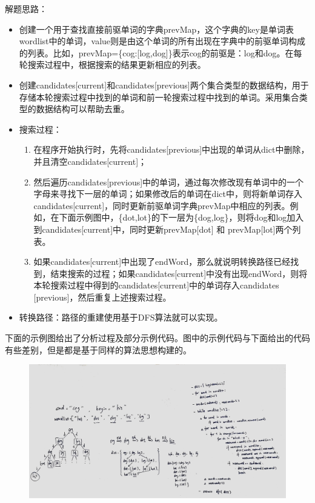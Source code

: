 \documentclass[a4paper,10pt]{article}
\begin{document}
\begin{CJK*}{UTF8}{gbsn}
\noindent 解题思路：
\begin{itemize}
    \item 创建一个用于查找直接前驱单词的字典prevMap，这个字典的key是单词表wordlist中的单词，value则是由这个单词的所有出现在字典中的前驱单词构成的列表。比如，prevMap=\{cog:[log,dog]\}表示cog的前驱是：log和dog。在每轮搜索过程中，根据搜索的结果更新相应的列表。
    \item 创建candidates[current]和candidates[previous]两个集合类型的数据结构，用于存储本轮搜索过程中找到的单词和前一轮搜索过程中找到的单词。采用集合类型的数据结构可以帮助去重。
    \item 搜索过程：
        \begin{enumerate}
            \item 在程序开始执行时，先将candidates[previous]中出现的单词从dict中删除，并且清空candidates[current]；
            
            \item 然后遍历candidates[previous]中的单词，通过每次修改现有单词中的一个字母来寻找下一层的单词；如果修改后的单词在dict中，则将新单词存入candidates[current]，同时更新前驱单词字典prevMap中相应的列表。例如，在下面示例图中，\{dot,lot\}的下一层为\{dog,log\}，则将dog和log加入到candidates[current]中，同时更新prevMap[dot] 和 prevMap[lot]两个列表。
            
            \item 如果candidates[current]中出现了endWord，那么就说明转换路径已经找到，结束搜索的过程；如果candidates[current]中没有出现endWord，则将本轮搜索过程中得到的candidates[current]中的单词存入candidates [previous]，然后重复上述搜索过程。
        \end{enumerate}
    \item 转换路径：路径的重建使用基于DFS算法就可以实现。
\end{itemize}
下面的示例图给出了分析过程及部分示例代码。图中的示例代码与下面给出的代码有些差别，但是都是基于同样的算法思想构建的。
\end{CJK*}

\begin{figure}[h]
    \includegraphics[width=\textwidth]{leetcode126.jpg}
    \centering \\
\end{figure}
\end{document}
